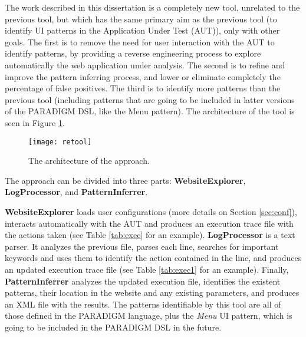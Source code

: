 The work described in this dissertation is a completely new tool, unrelated to the previous tool, but which has the same primary aim as the previous tool (to identify UI patterns in the Application Under Test (AUT)), only with other goals. The first is to remove the need for user interaction with the AUT to identify patterns, by providing a reverse engineering process to explore automatically the web application under analysis. The second is to refine and improve the pattern inferring process, and lower or eliminate completely the percentage of false positives. The third is to identify more patterns than the previous tool (including patterns that are going to be included in latter versions of the PARADIGM DSL, like the Menu pattern). The architecture of the tool is seen in Figure \ref{fig:retool}.

\begin{center}
\begin{figure}[!htb]
\centering
\texttt{[image: retool]}
\caption{The architecture of the approach.}
\label{fig:retool}
\end{figure}
\end{center}

The approach can be divided into three parts: \textbf{WebsiteExplorer}, \textbf{LogProcessor}, and \textbf{PatternInferrer}.

\textbf{WebsiteExplorer} loads user configurations (more details on Section \ref{sec:conf}), interacts automatically with the AUT and produces an execution trace file with the actions taken (see Table \ref{tab:exec} for an example). \textbf{LogProcessor} is a text parser. It analyzes the previous file, parses each line, searches for important keywords and uses them to identify the action contained in the line, and produces an updated execution trace file (see Table \ref{tab:exec1} for an example). Finally, \textbf{PatternInferrer} analyzes the updated execution file, identifies the existent patterns, their location in the website and any existing parameters, and produces an XML file with the results. The patterns identifiable by this tool are all of those defined in the PARADIGM language, plus the \textit{Menu} UI pattern, which is going to be included in the PARADIGM DSL in the future. \\

